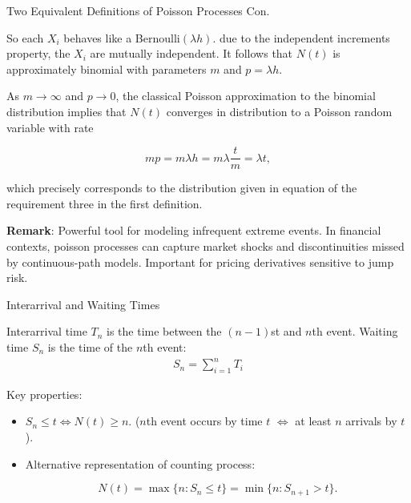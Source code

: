 \documentclass{beamer}
\begin{document}
\begin{frame}{Two Equivalent Definitions of Poisson Processes Con.}


    {\footnotesize \footnotesize
    \par So each $X_i$ behaves like a Bernoulli$(\lambda h)$. due to the independent increments property, the \( X_i \) are mutually independent. 
    It follows that \( N(t) \) is approximately binomial with parameters \( m \) and \( p = \lambda h \).
    \vspace{1em}\pause
    \par As \( m \to \infty \) and \( p \to 0 \), the classical Poisson approximation to the binomial distribution implies
     that \( N(t) \) converges in distribution to a Poisson random variable with rate

        \[
        mp = m\lambda h = m\lambda \frac{t}{m} = \lambda t,
        \]
    \vspace{1em}
    \par  which precisely corresponds to the distribution given in equation of the requirement three in the first definition. 
    \pause  
    \vspace{1em}
    \par \textbf{Remark}: Powerful tool for modeling infrequent extreme events. In financial contexts, 
    poisson processes can capture market shocks and discontinuities missed by continuous-path models. Important for pricing derivatives sensitive to jump risk.

    }
\end{frame}


\begin{frame}{Interarrival and Waiting Times}


     {\footnotesize \footnotesize
    \par Interarrival time \( T_n \) is the time between the \((n - 1)\)st and \(n\)th event. Waiting time \( S_n \) is the time of the \(n\)th event:
    \begin{align*}
        S_n = \sum_{i=1}^n T_i
    \end{align*}\pause
    \par Key properties:
    \vspace{1em}
    \begin{itemize}
        \item \( S_n \leq t \iff N(t) \geq n \). (\(n\)th event occurs by time \(t\) $\iff$ at least \(n\) arrivals by \(t\)).\vspace{1em}
        \item Alternative representation of counting process:
    
        \[
        N(t) = \max\{n : S_n \leq t\} = \min\{n : S_{n+1} > t\}.
        \]
    \end{itemize}
     }
    
\end{frame}
\end{document}
